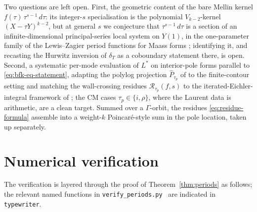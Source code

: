 \documentclass[11pt]{article}
\numberwithin{equation}{section}  %
\begin{document}
Two questions are left open.  First, the geometric content of the bare
Mellin kernel $f(\tau)\,\tau^{s-1}\,d\tau$: its integer-$s$
specialisation is the polynomial $V_{k-2}$-kernel $(X - \tau Y)^{k-2}$,
but at general $s$ we conjecture that $\tau^{s-1}\,d\tau$ is a section
of an infinite-dimensional principal-series local system on $Y(1)$, in
the one-parameter family of the Lewis--Zagier period functions for
Maass forms \cite{LewisZagier2001}; identifying it, and recasting the
Hurwitz inversion of $\delta_T$ as a coboundary statement there, is
open.  Second, a systematic per-mode evaluation of $L^*$ on
interior-pole forms parallel to \eqref{eq:bfk-eq-statement}, adapting
the polylog projection $\widehat{P}_{\tau_p}$ of \cite{1806} to the
finite-contour setting and matching the wall-crossing residues
$\mathcal{R}_{\tau_p}(f, s)$ to the iterated-Eichler-integral framework
of \cite{Brown2017}; the CM cases $\tau_p \in \{i, \rho\}$, where the
Laurent data is arithmetic, are a clean target.  Summed over a
$\Gamma$-orbit, the residues \eqref{eq:residue-formula} assemble into a
weight-$k$ Poincar\'e-style sum in the pole location, taken up
separately.

\appendix

\section{Numerical verification}\label{sec:numerics}

The verification is layered through the proof of
Theorem~\ref{thm:periods} as follows; the relevant named functions in
\texttt{verify\_periods.py}~\cite{VerifyScripts} are indicated in
\texttt{typewriter}.
\end{document}
